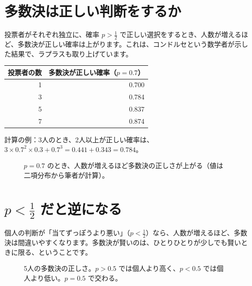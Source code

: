 \documentclass[a4paper,11pt,openany]{ltjsbook}
\begin{document}
\section{多数決は正しい判断をするか}

投票者がそれぞれ独立に、確率 $p>\frac12$ で正しい選択をするとき、人数が増えるほど、多数決が正しい確率は上がります。これは、コンドルセという数学者が示した結果で、ラプラスも取り上げています。

\begin{center}
\begin{tabular}{rr}
\toprule
投票者の数 & 多数決が正しい確率（$p=0.7$）\\
\midrule
1 & 0.700\\
3 & 0.784\\
5 & 0.837\\
7 & 0.874\\
\bottomrule
\end{tabular}
\end{center}

計算の例：3人のとき、2人以上が正しい確率は、$3\times0.7^2\times0.3+0.7^3=0.441+0.343=0.784$。

\begin{figure}[htbp]
\centering
{}
\caption{$p=0.7$ のとき、人数が増えるほど多数決の正しさが上がる（値は二項分布から筆者が計算）。}
\end{figure}

\section{$p<\frac12$ だと逆になる}

個人の判断が「当てずっぽうより悪い」（$p<\frac12$）なら、人数が増えるほど、多数決は間違いやすくなります。多数決が賢いのは、ひとりひとりが少しでも賢いときに限る、ということです。

\begin{figure}[htbp]
\centering
{}
\caption{5人の多数決の正しさ。$p>0.5$ では個人より高く、$p<0.5$ では個人より低い。$p=0.5$ で交わる。}
\end{figure}
\end{document}
